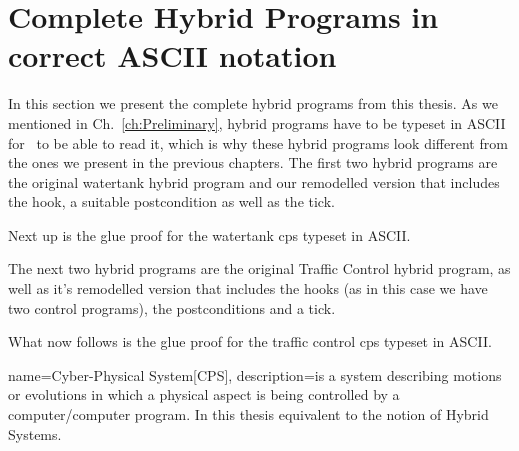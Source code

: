 \section{Complete Hybrid Programs in correct ASCII notation}
\label{app:sec:pdfs}

In this section we present the complete hybrid programs from this thesis. As we mentioned in Ch.~\ref{ch:Preliminary}, hybrid programs have to be typeset in ASCII for \keym~to be able to read it, which is why these hybrid programs look different from the ones we present in the previous chapters. The first two hybrid programs are the original watertank hybrid program and our remodelled version that includes the hook, a suitable postcondition as well as the tick.




Next up is the glue proof for the watertank cps typeset in ASCII.



The next two hybrid programs are the original Traffic Control hybrid program, as well as it's remodelled version that includes the hooks (as in this case we have two control programs), the postconditions and a tick.




What now follows is the glue proof for the traffic control cps typeset in ASCII.


 {
 name=Cyber-Physical System[CPS],
 description={is a system describing motions or evolutions in which a physical aspect is being controlled by a computer/computer program. In this thesis equivalent to the notion of Hybrid Systems.}
}



